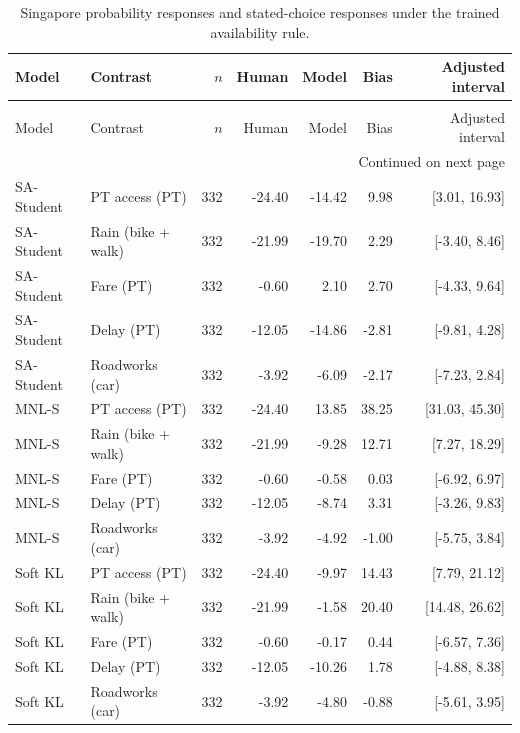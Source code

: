 \begingroup\footnotesize\setlength{\tabcolsep}{3pt}\renewcommand{\arraystretch}{1.12}
\begin{longtable}{@{\extracolsep{\fill}}llrrrrr@{}}
\caption{Singapore probability responses and stated-choice responses under the trained availability rule.}\label{tab:responses_singapore_0}\\
\toprule
Model & Contrast & $n$ & Human & Model & Bias & Adjusted interval \\
\midrule
\label{tab:responses_singapore_1}\endfirsthead
\multicolumn{7}{l}{\small\itshape Singapore response comparison (continued)}\\
\toprule
Model & Contrast & $n$ & Human & Model & Bias & Adjusted interval \\
\midrule
\endhead
\midrule\multicolumn{7}{r}{\footnotesize Continued on next page}\\\endfoot
\bottomrule\endlastfoot
SA-Student & PT access (PT) & 332 & -24.40 & -14.42 & 9.98 & [3.01, 16.93] \\
SA-Student & Rain (bike + walk) & 332 & -21.99 & -19.70 & 2.29 & [-3.40, 8.46] \\
SA-Student & Fare (PT) & 332 & -0.60 & 2.10 & 2.70 & [-4.33, 9.64] \\
SA-Student & Delay (PT) & 332 & -12.05 & -14.86 & -2.81 & [-9.81, 4.28] \\
SA-Student & Roadworks (car) & 332 & -3.92 & -6.09 & -2.17 & [-7.23, 2.84] \\
MNL-S & PT access (PT) & 332 & -24.40 & 13.85 & 38.25 & [31.03, 45.30] \\
MNL-S & Rain (bike + walk) & 332 & -21.99 & -9.28 & 12.71 & [7.27, 18.29] \\
MNL-S & Fare (PT) & 332 & -0.60 & -0.58 & 0.03 & [-6.92, 6.97] \\
MNL-S & Delay (PT) & 332 & -12.05 & -8.74 & 3.31 & [-3.26, 9.83] \\
MNL-S & Roadworks (car) & 332 & -3.92 & -4.92 & -1.00 & [-5.75, 3.84] \\
Soft KL & PT access (PT) & 332 & -24.40 & -9.97 & 14.43 & [7.79, 21.12] \\
Soft KL & Rain (bike + walk) & 332 & -21.99 & -1.58 & 20.40 & [14.48, 26.62] \\
Soft KL & Fare (PT) & 332 & -0.60 & -0.17 & 0.44 & [-6.57, 7.36] \\
Soft KL & Delay (PT) & 332 & -12.05 & -10.26 & 1.78 & [-4.88, 8.38] \\
Soft KL & Roadworks (car) & 332 & -3.92 & -4.80 & -0.88 & [-5.61, 3.95] \\

\end{longtable}
